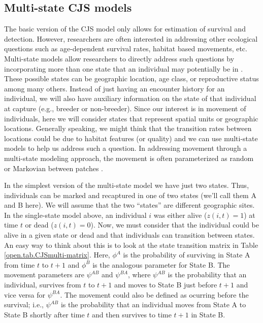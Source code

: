\subsection{Multi-state CJS models}

The basic version of the CJS model only allows for estimation of
survival and detection.  However, researchers are often interested in
addressing other ecological questions such as age-dependent survival
rates, habitat based movements, etc.  Multi-state models allow
researchers to directly address such questions by incorporating more
than one state that an individual may potentially be in
\citep{arnason:1972,arnason:1973, brownie_etal:1993}.  These possible
states can be geographic location, age class, or reproductive status
among many others.  Instead of just having an encounter history for an
individual, we will also have auxiliary information on the state of
that individual at capture (e.g., breeder or non-breeder).  Since our
interest is in movement of individuals, here we will consider states
that represent spatial units or geographic locations.  Generally
speaking, we might think that the transition rates between locations
could be due to habitat features (or quality) and we can use
multi-state models to help us address such a question.  In addressing
movement through a multi-state modeling approach, the movement is
often parameterized as random or Markovian between patches
\citep{arnason:1972,arnason:1973, schwarz_etal:1993}.

In the simplest version of the multi-state model we have just two
states.  Thus, individuals can be marked and recaptured in one of two
states (we'll call them A and B here).  We will assume that the two
``states'' are different geographic sites.  In the single-state model
above, an individual $i$ was either alive ($z(i,t)=1$) at time $t$ or
dead ($z(i,t)=0$).  Now, we must consider that the individual could be
alive in a given state or dead and that individuals can transition
between states.  An easy way to think about this is to look at the
state transition matrix in Table \ref{open.tab.CJSmulti-matrix}.
Here, $\phi^A$ is the probability of surviving in State A from time
$t$ to $t+1$ and $\phi^B$ is the analogous parameter for State B.  The
movement parameters are $\psi^{AB}$ and $\psi^{BA}$, where $\psi^{AB}$
is the probability that an individual, survives from $t$ to $t+1$ and
moves to State B just before $t+1$ and vice versa for $\psi^{BA}$.
The movement could also be defined as ocurring before the survival;
i.e., $\psi^{AB}$ is the probability that an individual moves from
State A to State B shortly after time $t$ and then survives to time
$t+1$ in State B.

